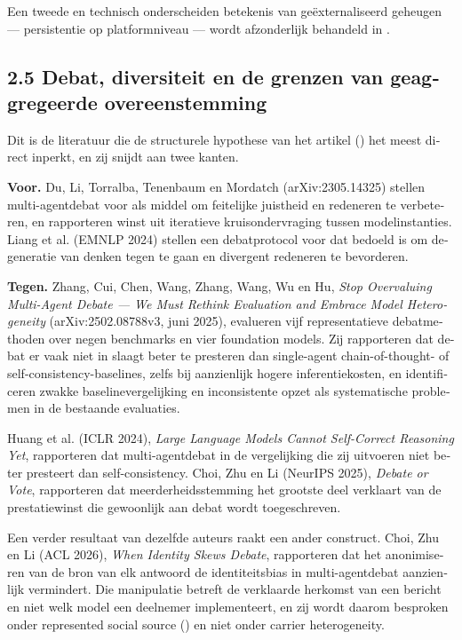 \begin{dutch}
Een tweede en technisch onderscheiden betekenis van geëxternaliseerd geheugen — persistentie op platformniveau — wordt afzonderlijk behandeld in .


\subsection*{2.5 Debat, diversiteit en de grenzen van geaggregeerde overeenstemming}
\label{sec:nl:2.5}

Dit is de literatuur die de structurele hypothese van het artikel () het meest direct inperkt, en zij snijdt aan twee kanten.

\textbf{Voor.} \gcheck{} Du, Li, Torralba, Tenenbaum en Mordatch (arXiv:2305.14325) stellen multi-agentdebat voor als middel om feitelijke juistheid en redeneren te verbeteren, en rapporteren winst uit iteratieve kruisondervraging tussen modelinstanties. \gcheck{} Liang et al. (EMNLP 2024) stellen een debatprotocol voor dat bedoeld is om degeneratie van denken tegen te gaan en divergent redeneren te bevorderen.

\textbf{Tegen.} \gcheck{} Zhang, Cui, Chen, Wang, Zhang, Wang, Wu en Hu, \emph{Stop Overvaluing Multi-Agent Debate — We Must Rethink Evaluation and Embrace Model Heterogeneity} (arXiv:2502.08788v3, juni 2025), evalueren vijf representatieve debatmethoden over negen benchmarks en vier foundation models. Zij rapporteren dat debat er vaak niet in slaagt beter te presteren dan single-agent chain-of-thought- of self-consistency-baselines, zelfs bij aanzienlijk hogere inferentiekosten, en identificeren zwakke baselinevergelijking en inconsistente opzet als systematische problemen in de bestaande evaluaties.

\gcheck{} Huang et al. (ICLR 2024), \emph{Large Language Models Cannot Self-Correct Reasoning Yet}, rapporteren dat multi-agentdebat in de vergelijking die zij uitvoeren niet beter presteert dan self-consistency. \gcheck{} Choi, Zhu en Li (NeurIPS 2025), \emph{Debate or Vote}, rapporteren dat meerderheidsstemming het grootste deel verklaart van de prestatiewinst die gewoonlijk aan debat wordt toegeschreven.

Een verder resultaat van dezelfde auteurs raakt een ander construct. \gcheck{} Choi, Zhu en Li (ACL 2026), \emph{When Identity Skews Debate}, rapporteren dat het anonimiseren van de bron van elk antwoord de identiteitsbias in multi-agentdebat aanzienlijk vermindert. Die manipulatie betreft de verklaarde herkomst van een bericht en niet welk model een deelnemer implementeert, en zij wordt daarom besproken onder represented social source () en niet onder carrier heterogeneity.


\end{dutch}
